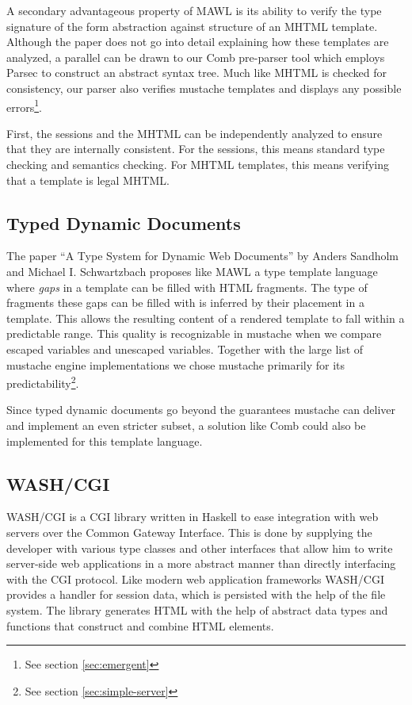 \documentclass[thesis.tex]{subfiles}
\begin{document}
A secondary advantageous property of MAWL is its ability to verify the
type signature of the form abstraction against structure of an MHTML template.
Although the paper does not go into detail explaining how these templates are
analyzed, a parallel can be drawn to our Comb pre-parser tool which employs
Parsec to construct an abstract syntax tree. Much like MHTML is checked for
consistency, our parser also verifies mustache templates and displays any
possible errors\footnote{See section \ref{sec:emergent}}.
\begin{citequote}{\cite{MAWL}}
First, the sessions and the MHTML can be independently analyzed to ensure that
they are internally consistent.
For the sessions, this means standard type checking and semantics checking.
For MHTML templates, this means verifying that a template is legal MHTML.
\end{citequote}

\subsection{Typed Dynamic Documents}
The paper ``A Type System for Dynamic Web Documents'' by Anders Sandholm and
Michael I. Schwartzbach proposes like MAWL a type template language where
\emph{gaps} in a template can be filled with HTML fragments. The type of
fragments these gaps can be filled with is inferred by their placement in a
template. This allows the resulting content of a rendered template to fall
within a predictable range. This quality is recognizable in mustache when we
compare escaped variables and unescaped variables. Together with the large list
of mustache engine implementations we chose mustache primarily for its
predictability\footnote{See section \ref{sec:simple-server}}.

Since typed dynamic documents go beyond the guarantees mustache can deliver
and implement an even stricter subset, a solution like Comb could also be
implemented for this template language.

\subsection{WASH/CGI}
WASH/CGI \cite{WASH} is a CGI library written in Haskell to ease integration
with web servers over the Common Gateway Interface. This is done by supplying
the developer with various type classes and other interfaces that allow him to
write server-side web applications in a more abstract manner than directly
interfacing with the CGI protocol. Like modern web application frameworks
WASH/CGI provides a handler for session data, which is persisted with the help
of the file system.
The library generates HTML with the help of abstract data types and functions
that construct and combine HTML elements.
\end{document}
